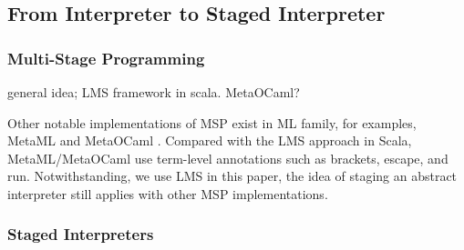 \subsection{From Interpreter to Staged Interpreter}

\subsubsection{Multi-Stage Programming}
general idea; LMS framework in scala. MetaOCaml?

Other notable implementations of MSP exist in ML family, for examples, MetaML \cite{DBLP:conf/pepm/TahaS97} 
and MetaOCaml \cite{DBLP:conf/gpce/CalcagnoTHL03, DBLP:conf/flops/Kiselyov14}.
Compared with the LMS approach in Scala, MetaML/MetaOCaml use term-level annotations such as brackets, 
escape, and run. Notwithstanding, we use LMS in this paper, the idea of staging an abstract interpreter
still applies with other MSP implementations.

\subsubsection{Staged Interpreters} 
